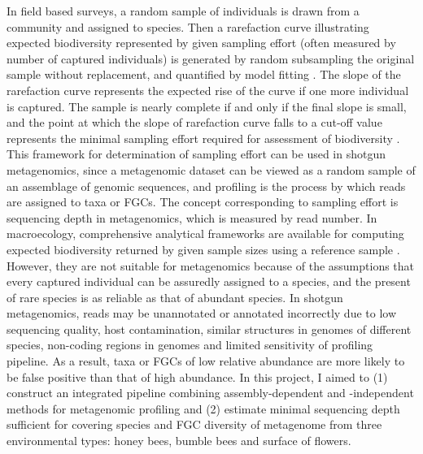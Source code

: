 \documentclass[11pt]{article}
\begin{document}
  In field based surveys, a random sample of individuals is drawn from a community and assigned to species. 
  Then a rarefaction curve illustrating expected biodiversity represented by given sampling effort (often measured by number of captured individuals) is generated by random subsampling the original sample without replacement, and quantified by model fitting \citep{hughes2005application,gotelli2011estimating}. 
  The slope of the rarefaction curve represents the expected rise of the curve if one more individual is captured. 
  The sample is nearly complete if and only if the final slope is small, and the point at which the slope of rarefaction curve falls to a cut-off value represents the minimal sampling effort required for assessment of biodiversity \citep{heck1975explicit,moreno2000assessing,hortal2004butterfly,hortal2005ed,chao2012coverage,gomez2014using,roswell2021conceptual}. 
  This framework for determination of sampling effort can be used in shotgun metagenomics, since a metagenomic dataset can be viewed as a random sample of an assemblage of genomic sequences, and 
  profiling is the process by which reads are assigned to taxa or FGCs. 
  The concept corresponding to sampling effort is sequencing depth in metagenomics, which is measured by read number.
  \newline 
  In macroecology, comprehensive analytical frameworks are available for computing expected biodiversity returned by given sample sizes using a reference sample \citep{heck1975explicit,chao2012coverage,chao2014rarefaction}. 
  However, they are not suitable for metagenomics because 
  of the assumptions that every captured individual can be assuredly assigned to a species, and the present of rare species is as reliable as that of abundant species. 
  In shotgun metagenomics, reads may be unannotated or annotated incorrectly due to low sequencing quality, host contamination, similar structures in genomes of different species, non-coding regions in genomes and limited sensitivity of profiling pipeline. 
  As a result, taxa or FGCs of low relative abundance are more likely to be false positive than that of high abundance.
  \newline
  In this project, I aimed to (1) construct an integrated pipeline combining assembly-dependent and -independent methods for metagenomic profiling and (2) estimate minimal sequencing depth sufficient for covering species and FGC diversity of metagenome from three environmental types: honey bees, bumble bees and surface of flowers. 
\end{document}

